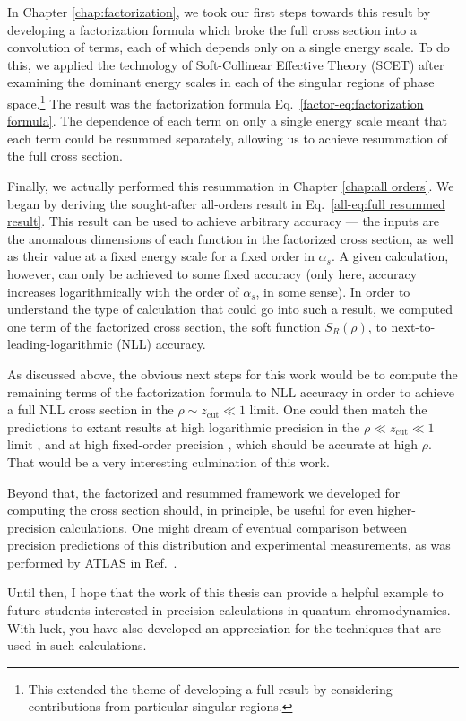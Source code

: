 \documentclass[../thesis.tex]{subfiles}
\providecommand{\zcut}{z_\mathrm{{cut}}}
\begin{document}
	In Chapter \ref{chap:factorization}, we took our first steps towards this result by developing a factorization formula which broke the full cross section into a convolution of terms, each of which depends only on a single energy scale. To do this, we applied the technology of Soft-Collinear Effective Theory (SCET) after examining the dominant energy scales in each of the singular regions of phase space.\footnote{This extended the theme of developing a full result by considering contributions from particular singular regions.} The result was the factorization formula Eq.~\ref{factor-eq:factorization formula}. The dependence of each term on only a single energy scale meant that each term could be resummed separately, allowing us to achieve resummation of the full cross section.

	Finally, we actually performed this resummation in Chapter \ref{chap:all orders}. We began by deriving the sought-after all-orders result in Eq.~\ref{all-eq:full resummed result}. This result can be used to achieve arbitrary accuracy --- the inputs are the anomalous dimensions of each function in the factorized cross section, as well as their value at a fixed energy scale for a fixed order in $\alpha_s$. A given calculation, however, can only be achieved to some fixed accuracy (only here, accuracy increases logarithmically with the order of $\alpha_s$, in some sense). In order to understand the type of calculation that could go into such a result, we computed one term of the factorized cross section, the soft function $S_R(\rho)$, to next-to-leading-logarithmic (NLL) accuracy.

	As discussed above, the obvious next steps for this work would be to compute the remaining terms of the factorization formula to NLL accuracy in order to achieve a full NLL cross section in the $\rho \sim \zcut \ll 1$ limit. One could then match the predictions to extant results at high logarithmic precision in the $\rho \ll \zcut \ll 1$ limit \cite{kardos_groomed_2020,kardos_two-_2020,frye_factorization_2016}, and at high fixed-order precision \cite{kardos_soft-drop_2018}, which should be accurate at high $\rho$. That would be a very interesting culmination of this work.

	Beyond that, the factorized and resummed framework we developed for computing the cross section should, in principle, be useful for even higher-precision calculations. One might dream of eventual comparison between precision predictions of this distribution and experimental measurements, as was performed by ATLAS in Ref.~\cite{atlas_collaboration_measurement_2020-1}.

	Until then, I hope that the work of this thesis can provide a helpful example to future students interested in precision calculations in quantum chromodynamics. With luck, you have also developed an appreciation for the techniques that are used in such calculations.


%  
% 
\end{document}
